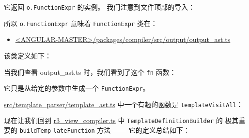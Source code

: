 它返回 \texttt{o.FunctionExpr} 的实例。
我们注意到文件顶部的导入：




所以 \texttt{o.FunctionExpr} 意味着 \texttt{FunctionExpr} 类在：

\begin{itemize}
      \item \href{https://github.com/angular/angular/blob/master/packages/compiler/src/output/output_ast.ts}
            {<ANGULAR-MASTER>/packages/compiler/src/output/output\_ast.ts}
\end{itemize}


该类定义如下：




当我们查看 output\_ast.ts 时，我们看到了这个 \texttt{fn} 函数：




它只是从给定的参数中生成一个 \texttt{FunctionExpr}。


\href{https://github.com/angular/angular/blob/master/packages/compiler/src/template_parser/template_ast.ts}
{src/template\_parser/template\_ast.ts}
中一个有趣的函数是 \texttt{templateVisitAll}：




现在让我们回到
\href{https://github.com/angular/angular/blob/master/packages/compiler/src/render3/r3_view_compiler.ts}
{r3\_view\_compiler.ts}
中 \texttt{TemplateDefinitionBuilder} 的
极其重要的
\texttt{buildTemp}
\texttt{lateFunction} 方法 —— 它的定义总结如下：

